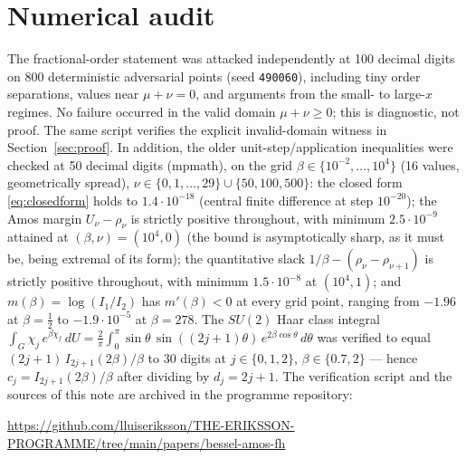 \documentclass[11pt]{article}
\theoremstyle{remark}
\begin{document}
\section{Numerical audit}
\label{sec:numerics}

The fractional-order statement was attacked independently at 100
decimal digits on 800 deterministic adversarial points (seed
\texttt{490060}), including tiny order separations, values near
$\mu+\nu=0$, and arguments from the small- to large-$x$ regimes.  No
failure occurred in the valid domain $\mu+\nu\ge0$; this is diagnostic,
not proof.  The same script verifies the explicit invalid-domain
witness in Section~\ref{sec:proof}.  In addition, the older
unit-step/application inequalities were checked at 50 decimal digits
(mpmath), on the grid $\beta \in \{10^{-2}, \dots, 10^4\}$ (16 values,
geometrically spread), $\nu \in \{0, 1, \dots, 29\} \cup \{50, 100,
500\}$: the closed form \eqref{eq:closedform} holds to $1.4\cdot
10^{-18}$ (central finite difference at step $10^{-20}$); the Amos
margin $U_\nu - \rho_\nu$ is strictly positive throughout, with minimum
$2.5\cdot 10^{-9}$ attained at $(\beta,\nu) = (10^4, 0)$ (the bound is
asymptotically sharp, as it must be, being extremal of its form); the
quantitative slack $1/\beta - (\rho_\nu - \rho_{\nu+1})$ is strictly
positive throughout, with minimum $1.5\cdot10^{-8}$ at $(10^4, 1)$; and
$m(\beta) = \log(I_1/I_2)$ has $m'(\beta) < 0$ at every grid point,
ranging from $-1.96$ at $\beta = \tfrac12$ to $-1.9\cdot10^{-5}$ at
$\beta = 278$. The $SU(2)$ Haar class integral
$\int_G \chi_j\, e^{\beta\chi_f}\,dU = \frac{2}{\pi}\int_0^\pi
\sin\theta\, \sin((2j+1)\theta)\, e^{2\beta\cos\theta}\, d\theta$
was verified to equal $(2j+1)\, I_{2j+1}(2\beta)/\beta$ to 30 digits
at $j \in \{0,1,2\}$, $\beta \in \{0.7, 2\}$ --- hence
$c_j = I_{2j+1}(2\beta)/\beta$ after dividing by $d_j = 2j+1$. The verification script and the
sources of this note are archived in the programme repository:
\begin{center}\small
\url{https://github.com/lluiseriksson/THE-ERIKSSON-PROGRAMME/tree/main/papers/bessel-amos-fh}
\end{center}
\end{document}
